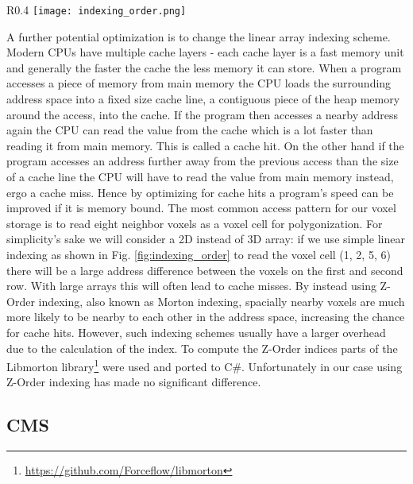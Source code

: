 \begin{wrapfigure}{R}{0.4\textwidth}
\texttt{[image: indexing\_order.png]}
\caption{Simple linear indexing (left), Z-Order indexing (right). Each square represents a voxel in a 2D array. The blue line represents the order in which they are stored in main memory.}
\label{fig:indexing_order}
\end{wrapfigure}

A further potential optimization is to change the linear array indexing scheme. Modern CPUs have multiple cache layers - each cache layer is a fast memory unit and generally the faster the cache the less
memory it can store. When a program accesses a piece of memory from main memory the CPU loads the surrounding address space into a fixed size cache line, a contiguous piece of the heap memory around the access, into the cache.
If the program then accesses a nearby address again the CPU can read the value from the cache which is a lot faster than reading it from main memory. This is called a cache hit. On the other hand if the program accesses an address further away from the previous access than the size of a cache line the CPU will have to read the value from main memory instead, ergo a cache miss. Hence by optimizing for cache hits a program's speed can be improved if it is memory bound. The most
common access pattern for our voxel storage is to read eight neighbor voxels as a voxel cell for polygonization.
For simplicity's sake we will consider a 2D instead of 3D array: if we use simple linear indexing as shown in Fig. \ref{fig:indexing_order} to read the voxel cell (1, 2, 5, 6) there will be a large address difference between the voxels
on the first and second row. With large arrays this will often lead to cache misses. By instead using Z-Order indexing, also known as Morton indexing, spacially nearby voxels are much more likely to be nearby to each other in the address space, increasing the chance for cache hits. However, such indexing schemes usually have a larger overhead due to the calculation of the index. To compute the Z-Order indices parts of the Libmorton library\footnote{\url{https://github.com/Forceflow/libmorton}} were used and ported to C\#. Unfortunately in our case using Z-Order indexing has made no significant difference.


\subsection{CMS}


